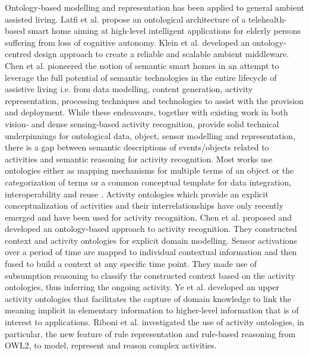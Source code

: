 Ontology-based modelling and representation has been applied to general ambient assisted living. Latfi et al. \cite{Latfi2007} propose an ontological architecture of a telehealth-based smart home aiming at high-level intelligent applications for elderly persons suffering from loss of cognitive autonomy. Klein et al. \cite{Klein2007} developed an ontology-centred design approach to create a reliable and scalable ambient middleware. Chen et al. \cite{Chen2009} pioneered the notion of semantic smart homes in an attempt to leverage the full potential of semantic technologies in the entire lifecycle of assistive living i.e. from data modelling, content generation, activity representation, processing techniques and technologies to assist with the provision and deployment. While these endeavours, together with existing work in both vision- and dense sensing-based activity recognition, provide solid technical underpinnings for ontological data, object, sensor modelling and representation, there is a gap between semantic descriptions of events/objects related to activities and semantic reasoning for activity recognition. Most works use ontologies either as mapping mechanisms for multiple terms of an object \cite{Tapia2006} or the categorization of terms \cite{Yamada2007} or a common conceptual template for data integration, interoperability and reuse \cite{Latfi2007} \cite{Klein2007} \cite{Chen2009}. Activity ontologies which provide an explicit conceptualization of activities and their interrelationships have only recently emerged and have been used for activity recognition. Chen et al. \cite{Chen2009b} \cite{Chen2012a} proposed and developed an ontology-based approach to activity recognition. They constructed context and activity ontologies for explicit domain modelling. Sensor activations over a period of time are mapped to individual contextual information and then fused to build a context at any specific time point. They made use of subsumption reasoning to classify the constructed context based on the activity ontologies, thus inferring the ongoing activity. Ye et al. \cite{Ye2011} developed an upper activity ontologies that facilitates the capture of domain knowledge to link the meaning implicit in elementary information to higher-level information that is of interest to applications. Riboni et al. \cite{Riboni2011b} investigated the use of activity ontologies, in particular, the new feature of rule representation and rule-based reasoning from OWL2, to model, represent and reason complex activities.


